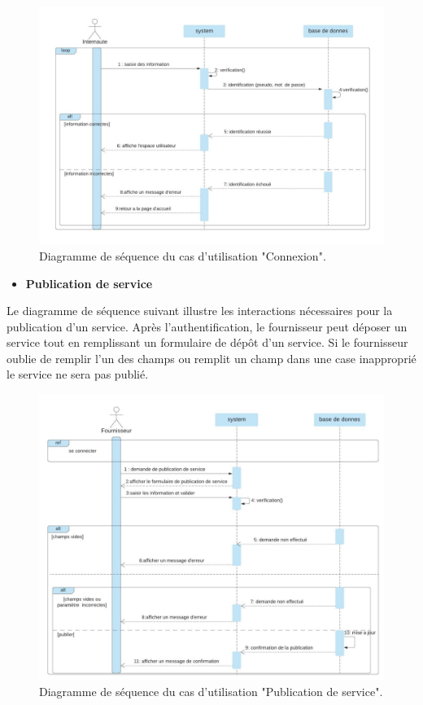 \documentclass[french]{report}
\begin{document}
        \begin{figure}[H]
            \centering
            \includegraphics[width=1\textwidth]{images/sequence diag authentification.jpg}
            \caption{Diagramme de séquence du cas d'utilisation "Connexion".}
            \label{fig:my_label}
        \end{figure}
        
\begin{itemize}
\item  \textbf{Publication de service}
\end{itemize}
	Le diagramme de séquence suivant illustre les interactions nécessaires pour la publication d'un service.
	Après l'authentification, le fournisseur peut déposer un service tout en remplissant un formulaire de 
	dépôt d'un service. Si le fournisseur oublie de remplir l'un des champs ou remplit un champ dans une case 
	inapproprié le service ne sera pas publié.
	
    \begin{figure}[H]
            \centering
            \includegraphics[width=1\textwidth]{images/sequence diag publier service.jpg}
            \caption{Diagramme de séquence du cas d'utilisation "Publication de service".}
            \label{fig:my_label}
    \end{figure}
        
\end{document}
